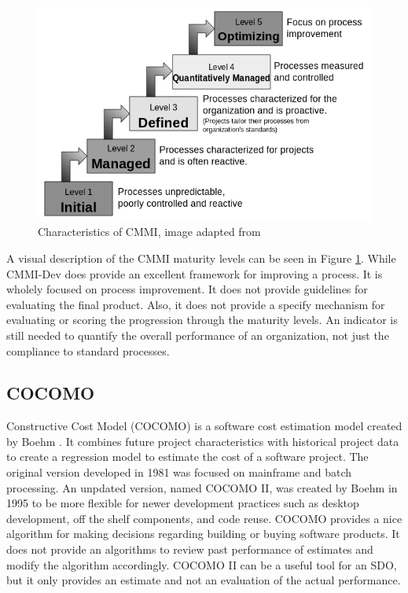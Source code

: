 \documentclass[SDSUThesis.tex]{subfiles}
\begin{document}
        
        \begin{figure}[here]
            \centering
            \includegraphics[scale=.7]{images/cmmi.png}
            \caption[Characteristics of CMMI]{Characteristics of CMMI, image adapted from  \cite{Godfrey} }
            \label{fig:cmmi}
        \end{figure}

A visual description of the CMMI maturity levels can be seen in Figure \ref{fig:cmmi}.  
While CMMI-Dev does provide an excellent framework for improving a process.  It
is wholely focused on process improvement.  It does not provide guidelines
for evaluating the final product.  
Also, it does not provide a specify mechanism for evaluating
or scoring the progression through the maturity levels.  
An indicator is still needed to quantify the overall performance of an organization, not
just the compliance to standard processes.  

\subsection{COCOMO}
    Constructive Cost Model (COCOMO) is a software cost estimation model created
    by Boehm \cite{Boehm1981}.  It combines future project characteristics
    with historical project data to create a regression model to estimate the 
    cost of a software project.  The original version developed in 1981 was
    focused on mainframe and batch processing.  An unpdated version, named
    COCOMO II, was created by Boehm in 1995 to be more flexible for newer 
    development practices such as desktop development, off the shelf components,
    and code reuse.  COCOMO provides a nice algorithm for making decisions
    regarding building or buying software products.  It does not provide 
    an algorithms to review past performance of estimates and modify the
    algorithm accordingly.  COCOMO II can be a useful tool for an SDO,
    but it only provides an estimate and not an evaluation of the actual
    performance.
\end{document}
